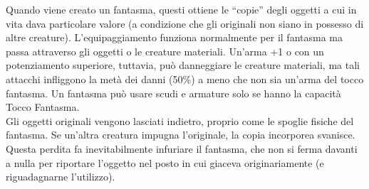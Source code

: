 \begin{multicols}{2}
Quando viene creato un fantasma, questi ottiene le “copie” degli oggetti a cui in vita dava particolare valore (a condizione che gli originali non siano in possesso di altre creature). L’equipaggiamento funziona normalmente per il fantasma ma passa attraverso gli oggetti o le creature materiali. Un’arma +1 o con un potenziamento superiore, tuttavia, può danneggiare le creature materiali, ma tali attacchi infliggono la metà dei danni (50\%) a meno che non sia un’arma del tocco fantasma. Un fantasma può usare scudi e armature solo se hanno la capacità Tocco Fantasma.\\

Gli oggetti originali vengono lasciati indietro, proprio come le spoglie fisiche del fantasma. Se un’altra creatura impugna l’originale, la copia incorporea svanisce. Questa perdita fa inevitabilmente infuriare il fantasma, che non si ferma davanti a nulla per riportare l’oggetto nel posto in cui giaceva originariamente (e riguadagnarne l’utilizzo).\\


\end{multicols}

